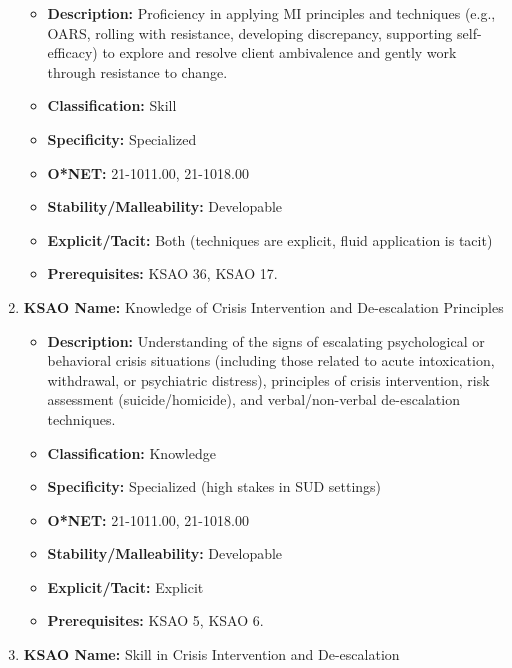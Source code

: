 \documentclass[
  letterpaper,
  DIV=11,
  numbers=noendperiod]{scrartcl}
\providecommand{\tightlist}{%
  \setlength{\itemsep}{0pt}\setlength{\parskip}{0pt}}
\begin{document}
\begin{enumerate}
  \begin{itemize}
  \tightlist
  \item
    \textbf{Description:} Proficiency in applying MI principles and
    techniques (e.g., OARS, rolling with resistance, developing
    discrepancy, supporting self-efficacy) to explore and resolve client
    ambivalence and gently work through resistance to change.
  \item
    \textbf{Classification:} Skill
  \item
    \textbf{Specificity:} Specialized
  \item
    \textbf{O*NET:} 21-1011.00, 21-1018.00
  \item
    \textbf{Stability/Malleability:} Developable
  \item
    \textbf{Explicit/Tacit:} Both (techniques are explicit, fluid
    application is tacit)
  \item
    \textbf{Prerequisites:} KSAO 36, KSAO 17.
  \end{itemize}
\item
  \textbf{KSAO Name:} Knowledge of Crisis Intervention and De-escalation
  Principles

  \begin{itemize}
  \tightlist
  \item
    \textbf{Description:} Understanding of the signs of escalating
    psychological or behavioral crisis situations (including those
    related to acute intoxication, withdrawal, or psychiatric distress),
    principles of crisis intervention, risk assessment
    (suicide/homicide), and verbal/non-verbal de-escalation techniques.
  \item
    \textbf{Classification:} Knowledge
  \item
    \textbf{Specificity:} Specialized (high stakes in SUD settings)
  \item
    \textbf{O*NET:} 21-1011.00, 21-1018.00
  \item
    \textbf{Stability/Malleability:} Developable
  \item
    \textbf{Explicit/Tacit:} Explicit
  \item
    \textbf{Prerequisites:} KSAO 5, KSAO 6.
  \end{itemize}
\item
  \textbf{KSAO Name:} Skill in Crisis Intervention and De-escalation


\end{enumerate}
\end{document}
